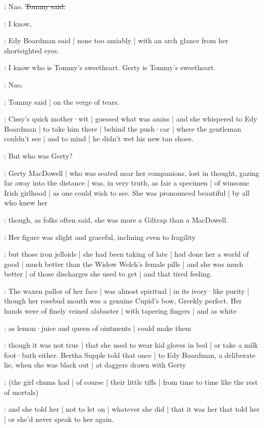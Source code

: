 \tommy:
Nao.
\sout{Tommy said.}

\edy:
I know,

:
Edy Boardman said |
none too amiably |
with an arch glance from her shortsighted eyes.

\edy:
I know who is Tommy's sweetheart.
Gerty is Tommy's sweetheart.

\tommy:
Nao,

:
Tommy said |
on the verge of tears.

\Nnovel:
Cissy's quick mother·wit |
guessed what was amiss |
and she whispered to Edy Boardman |
to take him there |
behind the push·car |
where the gentleman couldn't see |
and to mind |
he didn't wet his new tan shoes.

\gertyRomantic:
But who was Gerty?

\gertyNovel:
Gerty MacDowell |
who was seated near her companions,
lost in thought,
gazing far away into the distance |
was,%
in very truth,
as fair a specimen |
of winsome Irish girlhood |
as one could wish to see.
She was pronounced beautiful |
by all who knew her

\gertyReal:
though,
as folks often said,
she was more a Giltrap than a MacDowell.

\gertyNovel:
Her figure was slight and graceful,
inclining even to fragility

\gertyReal:
but those iron jelloids |
she had been taking of late |
had done her a world of good |
much better than the Widow Welch's female pills |
and she was much better |
of those discharges she used to get |
and that tired feeling.

\gertyNovel:
The waxen pallor of her face |
was almost spiritual |
in its ivory·like purity |
though her rosebud mouth was a genuine Cupid's bow,
Greekly perfect.
Her hands were of finely veined alabaster |
with tapering fingers |
and
as white

\gertyReal:
as lemon·juice
and queen of ointments |
could make them

\gertyJudgy:
though it was not true |
that she used to wear kid gloves in bed |
or take a milk foot·bath either.
Bertha Supple told that once |
to Edy Boardman,
a deliberate lie,
when she was black out |
at daggers drawn with Gerty

\gertyNovel:
(the girl chums had |
of course |
their little tiffs |
from time to time
like the rest of mortals)

\gertyJudgy:
and she told her |
not to let on |
whatever she did |
that it was her that told her |
or she'd never speak to her again.

